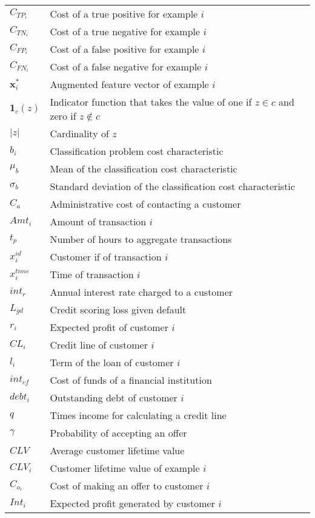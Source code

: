\begin{tabularx}{\textwidth}{ l X }
$C_{TP_i}$		& Cost of a true positive for example $i$	 \\
$C_{TN_i}$		& Cost of a true negative for example $i$	 \\	
$C_{FP_i}$		& Cost of a false positive for example $i$	 \\	
$C_{FN_i}$		& Cost of a false negative for example $i$	 \\	
$\mathbf{x}_i^*$ 	& Augmented feature vector of example $i$ \\	
$\mathbf{1}_c(z)$ & Indicator function that takes the value of one if $z \in c$ and 
zero if $z \notin c$ \\
$\vert z \vert$ & Cardinality of $z$ \\
$b_i$ & Classification problem cost characteristic \\
$\mu_b$ & Mean of the classification cost characteristic \\
$\sigma_b$ & Standard deviation of the classification cost characteristic \\
$C_a$ & Administrative cost of contacting a customer \\
$Amt_i$ & Amount of transaction $i$ \\
$t_p$ & Number of hours to aggregate transactions\\
$x_i^{id}$ & Customer if of transaction $i$ \\
$x_i^{time}$ & Time of transaction $i$ \\
$int_r$ & Annual interest rate charged to a customer \\
$L_{gd}$ & Credit scoring loss given default \\
$r_i$ & Expected profit of customer $i$ \\
$CL_i$ & Credit line of customer $i$ \\
$l_i$ & Term of the loan of customer $i$\\
$int_{cf}$ & Cost of funds of a financial institution \\
$debt_i$ & Outstanding debt of customer $i$\\
$q$ & Times income for calculating a credit line \\
$\gamma$  & Probability of accepting an offer \\
$CLV$ & Average customer lifetime value \\
$CLV_i$ & Customer lifetime value of example $i$ \\
$C_{o_i}$ & Cost of making an offer to customer $i$ \\
$Int_i$ & Expected profit generated by customer $i$ \\

\end{tabularx}
